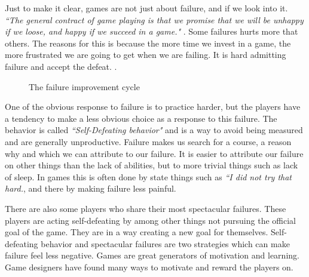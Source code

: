 Just to make it clear, games are not just about failure, and if we look into it. \textit{``The general contract of game playing is that we promise that we will be unhappy if we loose, and happy if we succeed in a game."} \cite[P.~29]{TheArtOfFailure}. Some failures hurts more that others. The reasons for this is because the more time we invest in a game, the more frustrated we are going to get when we are failing. It is hard admitting failure and accept the defeat. \cite[P.~47-48]{TheArtOfFailure}.

\begin{figure}[h!]
\centering
{}
\caption{The failure improvement cycle}
\medskip
\small\em
\label{fig:playerImprove}
\end{figure}

One of the obvious response to failure is to practice harder, but the players have a tendency to make a less obvious choice  as a response to this failure. The behavior is called \textit{``Self-Defeating behavior"} and is a way to avoid being measured and are generally unproductive. Failure makes us search for a course, a reason why and which we can attribute to our failure. It is easier to attribute our failure on other things than the lack of abilities, but to more trivial things such as lack of sleep. In games this is often done by state things such as \textit{``I did not try that hard.}, and there by making failure less painful.\cite[P.~63]{TheArtOfFailure}

There are also some players who share their most spectacular failures. These players are acting self-defeating by among other things not pursuing the official goal of the game. They are in a way creating a new goal for themselves. Self-defeating behavior and spectacular failures are two strategies which can make failure feel less negative. Games are great generators of motivation and learning. Game designers have found many ways to motivate and reward the players on. \cite[P.~64, P.~118]{TheArtOfFailure}






